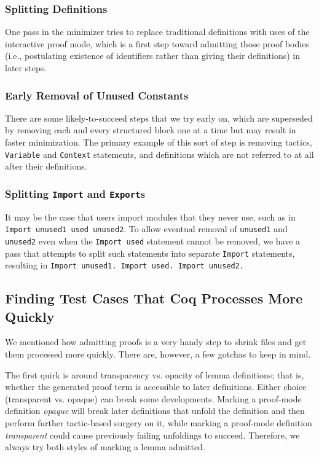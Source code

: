 \documentclass[a4paper,USenglish,cleveref,autoref,thm-restate]{lipics-v2021}
\begin{document}
\subsubsection{Splitting Definitions}
One pass in the minimizer tries to replace traditional definitions with uses of the interactive proof mode, which is a first step toward admitting those proof bodies (i.e., postulating existence of identifiers rather than giving their definitions) in later steps.

\subsubsection{Early Removal of Unused Constants}
There are some likely-to-succeed steps that we try early on, which are superseded by removing each and every structured block one at a time but may result in faster minimization.
The primary example of this sort of step is removing tactics, \verb|Variable| and \verb|Context| statements, and definitions which are not referred to at all after their definitions.

\subsubsection{Splitting \texttt{Import} and \texttt{Export}s}\label{sec:split-imports}
It may be the case that users import modules that they never use, such as in \texttt{Import unused1 used unused2}.
To allow eventual removal of \verb|unused1| and \verb|unused2| even when the \verb|Import used| statement cannot be removed, we have a pass that attempts to split such statements into separate \verb|Import| statements, resulting in \texttt{Import unused1. Import used. Import unused2.}

\subsection{Finding Test Cases That Coq Processes More Quickly}

We mentioned how admitting proofs is a very handy step to shrink files and get them processed more quickly.
There are, however, a few gotchas to keep in mind.

The first quirk is around transparency vs. opacity of lemma definitions; that is, whether the generated proof term is accessible to later definitions.
Either choice (transparent vs. opaque) can break some developments.
Marking a proof-mode definition \emph{opaque} will break later definitions that unfold the definition and then perform further tactic-based surgery on it, while marking a proof-mode definition \emph{transparent} could cause previously failing unfoldings to succeed.
Therefore, we always try both styles of marking a lemma admitted.
\end{document}
